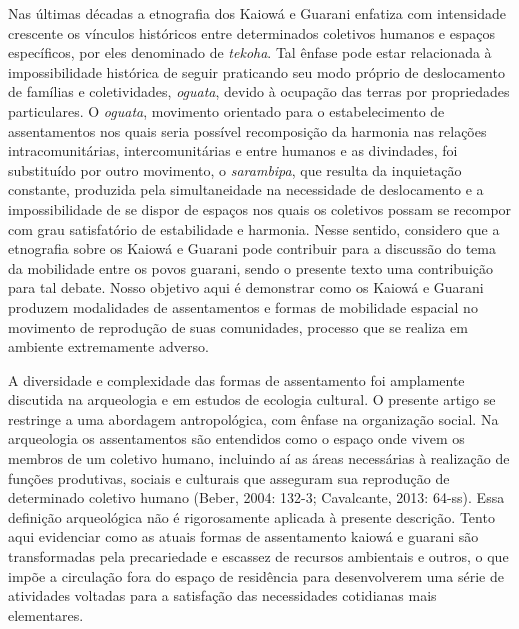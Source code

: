 Nas últimas décadas a etnografia dos Kaiowá e Guarani enfatiza com
intensidade crescente os vínculos históricos entre determinados
coletivos humanos e espaços específicos, por eles denominado de
\emph{tekoha}. Tal ênfase pode estar relacionada à impossibilidade
histórica de seguir praticando seu modo próprio de deslocamento de
famílias e coletividades, \emph{oguata}, devido à ocupação das terras
por propriedades particulares. O \emph{oguata}, movimento orientado para
o estabelecimento de assentamentos nos quais seria possível recomposição
da harmonia nas relações intracomunitárias, intercomunitárias e entre
humanos e as divindades, foi substituído por outro movimento, o
\emph{sarambipa}, que resulta da inquietação constante, produzida pela
simultaneidade na necessidade de deslocamento e a impossibilidade de se
dispor de espaços nos quais os coletivos possam se recompor com grau
satisfatório de estabilidade e harmonia. Nesse sentido, considero que a
etnografia sobre os Kaiowá e Guarani pode contribuir para a discussão do
tema da mobilidade entre os povos guarani, sendo o presente texto uma
contribuição para tal debate. Nosso objetivo aqui é demonstrar como os
Kaiowá e Guarani produzem modalidades de assentamentos e formas de
mobilidade espacial no movimento de reprodução de suas comunidades,
processo que se realiza em ambiente extremamente adverso.

A diversidade e complexidade das formas de assentamento foi amplamente
discutida na arqueologia e em estudos de ecologia cultural. O presente
artigo se restringe a uma abordagem antropológica, com ênfase na
organização social. Na arqueologia os assentamentos são entendidos como
o espaço onde vivem os membros de um coletivo humano, incluindo aí as
áreas necessárias à realização de funções produtivas, sociais e
culturais que asseguram sua reprodução de determinado coletivo humano
(Beber, 2004: 132-3; Cavalcante, 2013: 64-ss). Essa definição
arqueológica não é rigorosamente aplicada à presente descrição. Tento
aqui evidenciar como as atuais formas de assentamento kaiowá e guarani
são transformadas pela precariedade e escassez de recursos ambientais e
outros, o que impõe a circulação fora do espaço de residência para
desenvolverem uma série de atividades voltadas para a satisfação das
necessidades cotidianas mais elementares.

